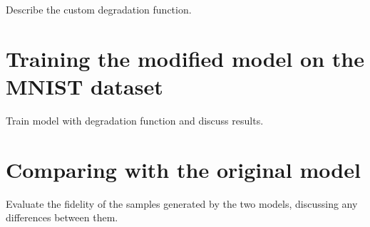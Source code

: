 \documentclass[12pt]{report} %
\begin{document}
Describe the custom degradation function.

\section{Training the modified model on the MNIST dataset}

Train model with degradation function and discuss results.

\section{Comparing with the original model}

Evaluate the fidelity of the samples generated by the two models, discussing any differences between them.






\end{document}
